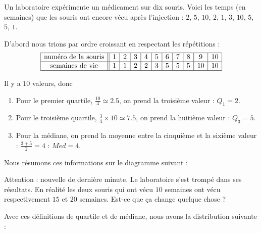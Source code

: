 \begin{example}

    Un laboratoire expérimente un médicament sur dix souris. Voici les temps (en semaines) que les souris ont encore vécu après l'injection : \( 2\), \( 5\), \( 10\), \( 2\), \( 1\), \( 3\), \( 10\), \( 5\), \( 5\), \( 1\).

    D'abord nous trions par ordre croissant en respectant les répétitions :
    \begin{equation*}
        \begin{array}[]{|c||c|c|c|c|c|c|c|c|c|c|}
            \hline
            \text{numéro de la souris}&1&2&3&4&5&6&7&8&9&10\\
            \hline
            \text{semaines de vie}&1&1&2&2&3&5&5&5&10&10\\
            \hline
        \end{array}
    \end{equation*}

    Il y a \( 10\) valeurs, donc 
    \begin{enumerate}
        \item
            Pour le premier quartile, \( \frac{ 10 }{ 4 }\simeq 2.5\), on prend la troisième valeur : \( Q_1=2\).
        \item
            Pour le troisième quartile, \( \frac{ 3}{ 4 }\times 10\simeq 7.5\), on prend la huitième valeur : \( Q_3=5\).
        \item
            Pour la médiane, on prend la moyenne entre la cinquième et la sixième valeur : \( \frac{ 3+5 }{2}=4\) : \( Med=4\).
    \end{enumerate}

    Nous résumons ces informations sur le diagramme suivant :


    \begin{center}
        
    \end{center}


    Attention : nouvelle de dernière minute. Le laboratoire s'est trompé dans ses résultats. En réalité les deux souris qui ont vécu \( 10\) semaines ont vécu respectivement \( 15\) et \( 20\) semaines. Est-ce que ça change quelque chose ?

\end{example}

Avec ces définitions de quartile et de médiane, nous avons la distribution suivante :

\begin{center}
   
\end{center}

